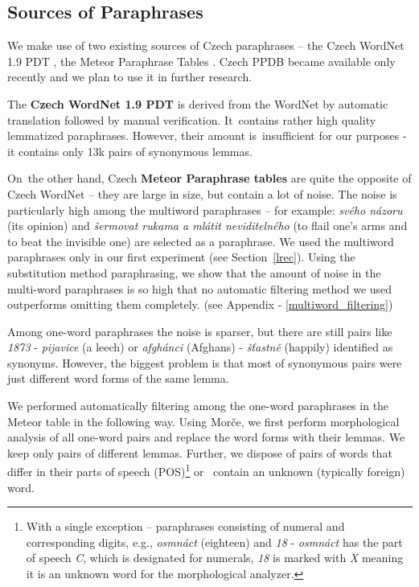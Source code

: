 \documentclass[11pt]{article}
\def\Tref#1{Table~\ref{#1}}
\def\Sref#1{Section~\ref{#1}}
\begin{document}
\subsection{Sources of Paraphrases}
\label{meteori}
We make use of two existing sources of Czech paraphrases -- the Czech WordNet 
1.9 PDT \cite{czech-wordnet}, the Meteor Paraphrase Tables \cite{meteor-tables}. 
Czech PPDB \cite{ppdb} became available only recently and we plan to use it in 
further research.

The \textbf{Czech WordNet 1.9 PDT} is derived from the WordNet \cite{wordnet} 
by automatic translation followed by manual verification. It~contains rather 
high quality lemmatized paraphrases. However, their amount is~insufficient for 
our purposes - it contains only 13k pairs of synonymous lemmas. %

On~the other hand, Czech \textbf{Meteor Paraphrase tables} are quite the 
opposite of Czech WordNet -- they are large in size, but contain a lot of 
noise. The noise is particularly high among the multiword paraphrases -- for 
example: \textit{svého názoru} (its opinion) and \textit{šermovat rukama a 
mlátit neviditelného} (to flail one's arms and to beat the invisible one) are 
selected as a paraphrase. We used the multiword paraphrases only in our first 
experiment (see \Sref{lrec}). Using the substitution method paraphrasing, we 
show that the amount of noise in the multi-word paraphrases is so high that no 
automatic filtering method we used outperforms omitting them completely. (see
Appendix - \ref{multiword_filtering})
 
Among one-word paraphrases the noise is sparser, but there are still pairs like 
\textit{1873} - \textit{pijavice} (a leech) or \textit{afgh\'{a}nci} (Afghans) -
\textit{š\v{t}astně} (happily) identified as synonyms. However, the biggest 
problem is that most of synonymous pairs were just different word forms of the 
same lemma. 

We performed automatically filtering among the one-word paraphrases in the 
Meteor table in the following way. Using Morče, we first perform morphological 
analysis of all one-word pairs and replace the word forms with their lemmas. We 
keep only pairs of different lemmas. Further, we dispose of pairs of words that 
differ in their parts of speech (POS)\footnote{With a single exception -- 
paraphrases consisting of numeral and corresponding digits, e.g., 
\textit{osmnáct} (eighteen) and \textit{18} - \textit{osmnáct} has the part of 
speech \textit{C}, which is designated for numerals, \textit{18} is marked with 
\textit{X} meaning it is an unknown word for the morphological analyzer.} or
~contain an unknown (typically foreign) word.
\end{document}
